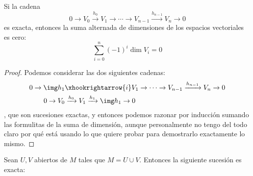 \documentclass[palatino, bibnumbers]{apuntes}
\begin{document}
\begin{prop} Si la cadena \[ 0 \to V_0 \xrightarrow{h_0} V_1 \to \dotsb \to V_{n-1} \xrightarrow{h_{n-1}} V_{n} \to 0 \] es exacta, entonces la suma alternada de dimensiones de los espacios vectoriales es cero:  \[ \sum_{i=0}^n (-1)^i \dim V_i = 0\]
\end{prop}

\begin{proof}
\label{prop:sumaAlternada0}
Podemos considerar las dos siguientes cadenas: \begin{align*}
0 \to \img h_1 & \xhookrightarrow{i} V_1 \to \dotsb \to V_{n-1} \xrightarrow{h_{n-1}} V_{n} \to 0 \\
0 \to V_0 &\xrightarrow{h_0} V_1 \xrightarrow{h_1} \img h_1 \to 0
\end{align*}, que son sucesiones exactas, y entonces podemos razonar por inducción sumando las formulitas de la suma de dimensión, aunque personalmente no tengo del todo claro por qué está usando lo que quiere probar para demostrarlo exactamente lo mismo.
\end{proof}

\begin{theorem} \label{thm:SucesionMayerVietoris} Sean $U,V$ abiertos de $M$ tales que $M = U ∪ V$. Entonces la siguiente sucesión es exacta:

\begin{center}
\tikzexternaldisable
{}
\tikzexternalenable
\end{center}
\end{theorem}
\end{document}
